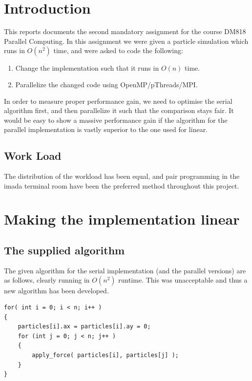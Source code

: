 \documentclass[a4paper,11pt,oneside]{book}
\begin{document}
\pagestyle{ruled}
\chapter{Introduction}
\setcounter{section}{1}
This reports documents the second mandatory assignment for the course DM818 Parallel Computing. In this assignment we were given a particle simulation which runs in $O(n^{2})$ time, and were asked to code the following:

\begin{enumerate}
\item Change the implementation such that it runs in $O(n)$ time.
\item Parallelize the changed code using OpenMP/pThreads/MPI.
\end{enumerate}

In order to measure proper performance gain, we need to optimise the serial algorithm first, and then parallelize it such that the comparison stays fair. It would be easy to show a massive performance gain if the algorithm for the parallel implementation is vastly superior to the one used for linear.
 
\section{Work Load}
The distribution of the workload has been equal, and pair programming in the imada terminal room have been the preferred method throughout this project.

\chapter{Making the implementation linear}
\section{The supplied algorithm}
The given algorithm for the serial implementation (and the parallel versions) are as follows, clearly running in $O(n^{2})$ runtime. This was unacceptable and thus a new algorithm has been developed.

\begin{verbatim}
for( int i = 0; i < n; i++ )
{
	particles[i].ax = particles[i].ay = 0;
	for (int j = 0; j < n; j++ )
	{
    	apply_force( particles[i], particles[j] );
    }
}
\end{verbatim}
\end{document}
